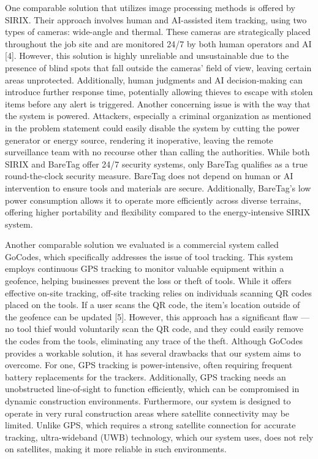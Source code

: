 \documentclass[conference]{IEEEtran}
\begin{document}
One comparable solution that utilizes image processing methods is offered 
by SIRIX. Their approach involves human and AI-assisted item tracking, 
using two types of cameras: wide-angle and thermal. These cameras are 
strategically placed throughout the job site and are monitored 24/7 by both
human operators and AI [4]. However, this solution is highly unreliable 
and unsustainable due to the presence of blind spots that fall outside 
the cameras' field of view, leaving certain areas unprotected. 
Additionally, human judgments and AI decision-making can introduce 
further response time, potentially allowing thieves to escape with 
stolen items before any alert is triggered. Another concerning issue 
is with the way that the system is powered. Attackers, especially a 
criminal organization as mentioned in the problem statement could easily 
disable the system by cutting the power generator or energy source, 
rendering it inoperative, leaving the remote surveillance team with no 
recourse other than calling the authorities. While both SIRIX and 
BareTag offer 24/7 security systems, only BareTag qualifies as a 
true round-the-clock security measure. BareTag does not depend on 
human or AI intervention to ensure tools and materials are secure. 
Additionally, BareTag's low power consumption allows it to operate 
more efficiently across diverse terrains, offering higher portability 
and flexibility compared to the energy-intensive SIRIX system.

Another comparable solution we evaluated is a commercial system called 
GoCodes, which specifically addresses the issue of tool tracking. This 
system employs continuous GPS tracking to monitor valuable equipment 
within a geofence, helping businesses prevent the loss or theft of tools. 
While it offers effective on-site tracking, off-site tracking relies on 
individuals scanning QR codes placed on the tools. If a user scans the 
QR code, the item's location outside of the geofence can be updated [5]. 
However, this approach has a significant flaw — no tool thief would 
voluntarily scan the QR code, and they could easily remove the codes 
from the tools, eliminating any trace of the theft. Although GoCodes 
provides a workable solution, it has several drawbacks that our system 
aims to overcome. For one, GPS tracking is power-intensive, often requiring
frequent battery replacements for the trackers. Additionally, GPS 
tracking needs an unobstructed line-of-sight to function efficiently, 
which can be compromised in dynamic construction environments. 
Furthermore, our system is designed to operate in very rural construction 
areas where satellite connectivity may be limited. Unlike GPS, which 
requires a strong satellite connection for accurate tracking, 
ultra-wideband (UWB) technology, which our system uses, does not rely on 
satellites, making it more reliable in such environments.
\end{document}
